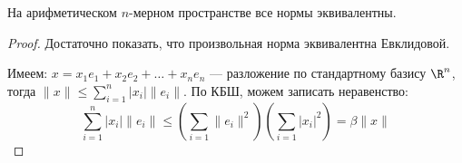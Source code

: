 \begin{corollary}
    На арифметическом \(n\)-мерном пространстве все нормы эквивалентны.
\end{corollary}
\begin{proof}
    Достаточно показать, что произвольная норма эквивалентна Евклидовой.
    
    Имеем: \(x = x_1e_1 + x_2e_2 + \dots + x_ne_n\) --- разложение по стандартному базису \(\R^n\), тогда \(\|x\| \le \sum_{i = 1}^n |x_i|\|e_i\|\). По КБШ, можем записать неравенство:
    \[\sum_{i = 1}^n |x_i|\|e_i\| \le \left(\sum_{i = 1}\|e_i\|^2\right)\left(\sum_{i = 1}|x_i|^2\right) = \beta \|x\|\]
\end{proof}
